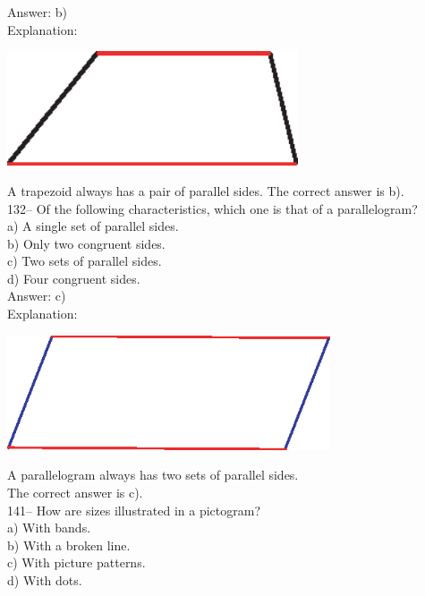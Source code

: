 \documentclass[letterpaper, 12pt]{article}
\begin{document}
Answer: b)\\

Explanation:\\
   \begin{center}
    \includegraphics[height=3.39cm]{131.eps}
    \end{center}
A trapezoid always has a pair of parallel sides. The correct answer is b).\\

132-- Of the following characteristics, which one is that of a parallelogram?\\

a) A single set of parallel sides.\\
b) Only two congruent sides.\\
c) Two sets of parallel sides.\\
d) Four congruent sides.\\

Answer: c)\\

Explanation: \\
   \begin{center}
    \includegraphics[height=3.39cm]{132.eps}
    \end{center}
A parallelogram always has two sets of parallel sides.\\  The correct answer is c).\\


141-- How are sizes illustrated in a pictogram?\\
a) With bands.\\
b) With a broken line.\\
c) With picture patterns.\\
d) With dots.\\
\end{document}
